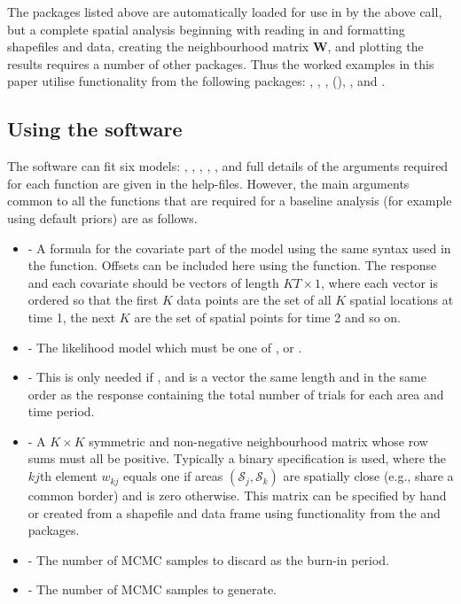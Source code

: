 \documentclass[article, nojss]{jss}
\begin{document}
The packages listed above are automatically loaded for use in  by the above call, but a complete spatial analysis beginning with reading in and formatting shapefiles and data, creating the neighbourhood matrix $\mathbf{W}$, and plotting the results requires a number of other packages. Thus the worked examples in this paper utilise functionality from the following packages: , , ,  (\citealp{maptools2015}), ,   and .


\subsection{Using the software}
The software can fit  six models: , , , ,  , and full details of the arguments required for each function are given in the help-files. However, the main arguments common to all the functions  that are required for a baseline analysis (for example using default priors) are as follows.

\begin{itemize}
\item {} - A formula for the covariate part of the model using the same syntax used in the  function. Offsets can be included here using the  function. The response and each covariate should be vectors of length $KT\times 1$, where each vector is ordered so that the first $K$ data points are the set of all $K$ spatial locations at time 1, the next $K$ are the set of spatial points for time 2 and so on.

\item {} - The likelihood model which must  be one of ,  or .

\item {} - This is only needed if  , and is a vector the same length and in the same order as the response containing the total number of trials  for each area and time period. 

\item {} - A $K \times K$ symmetric and non-negative neighbourhood matrix whose row sums must all be positive. Typically a binary specification is used, where the $kj$th element $w_{kj}$ equals one if areas $(\mathcal{S}_j, \mathcal{S}_k)$ are spatially close (e.g., share a common border) and is zero otherwise. This matrix can be specified by hand or created from a shapefile and data frame using functionality from the  and  packages. 

\item {} - The number of MCMC samples to discard as the burn-in period.
    
\item {} - The number of MCMC samples to generate.
\end{itemize}
\end{document}
